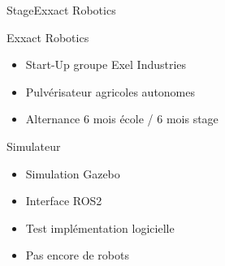 \begin{frame}{Stage}{Exxact Robotics}
    \begin{minipage}{0.5\textwidth}
        \begin{block}{Exxact Robotics}
            \begin{itemize}
                \item Start-Up groupe Exel Industries \\
                \item Pulvérisateur agricoles autonomes \\
                \item Alternance 6 mois école / 6 mois stage
            \end{itemize}
        \end{block}
        \begin{block}{Simulateur}
            \begin{itemize}
                \item Simulation Gazebo\\
                \item Interface ROS2 \\
                \item Test implémentation logicielle \\
                \item Pas encore de robots
            \end{itemize}
        \end{block}
    \end{minipage}
    \hfill
    \begin{minipage}{0.48\textwidth}
    \end{minipage}
\end{frame}